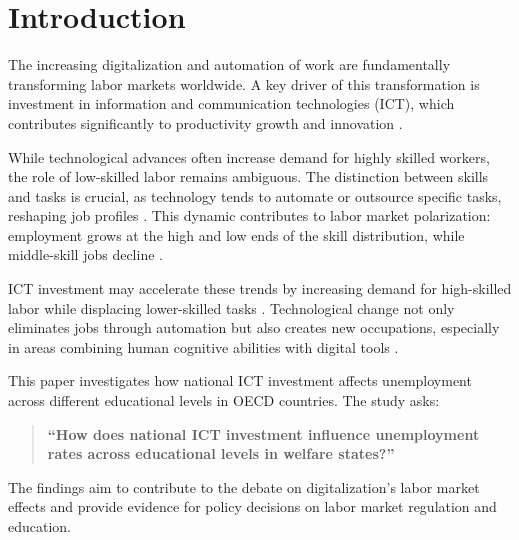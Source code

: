 \section{Introduction}

The increasing digitalization and automation of work are fundamentally transforming labor markets 
worldwide. A key driver of this transformation is investment in information and communication 
technologies (ICT), which contributes significantly to productivity growth and innovation 
\parencite[][p. 49]{oecd2019measuring}.

While technological advances often increase demand for highly skilled workers, the role of 
low-skilled labor remains ambiguous. The distinction between skills and tasks is crucial, as 
technology tends to automate or outsource specific tasks, reshaping job profiles 
\parencite[][p. 1045]{acemoglu2011skills}. This dynamic contributes to labor market polarization: 
employment grows at the high and low ends of the skill distribution, while middle-skill jobs 
decline \parencite[][p. 1070]{acemoglu2011skills}.

ICT investment may accelerate these trends by increasing demand for high-skilled labor while 
displacing lower-skilled tasks \parencite[][pp. 2–4]{balsmeier2019isthis}. Technological change 
not only eliminates jobs through automation but also creates new occupations, especially in 
areas combining human cognitive abilities with digital tools 
\parencite[][pp. 210–214]{brynjolfsson2014thesecond}.

This paper investigates how national ICT investment affects unemployment across different 
educational levels in OECD countries. The study asks:

\begin{quote}
\textbf{“How does national ICT investment influence unemployment rates across educational levels 
in welfare states?”}
\end{quote}

The findings aim to contribute to the debate on digitalization’s labor market effects and provide 
evidence for policy decisions on labor market regulation and education.